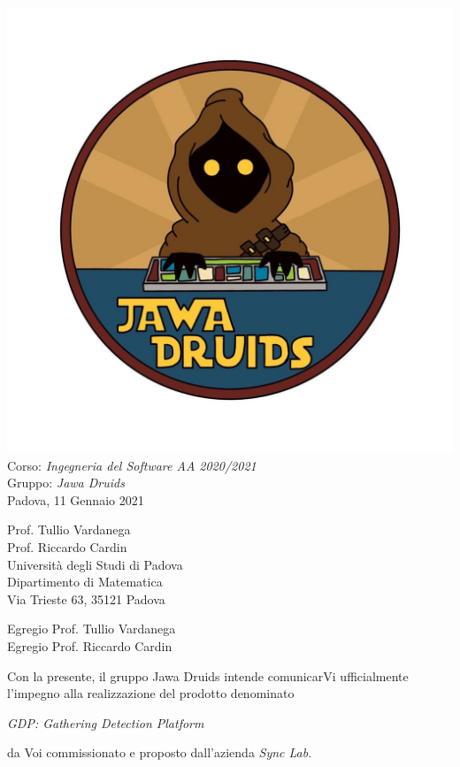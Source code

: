 \documentclass[a4paper,12pt]{report}
\begin{document}
\includegraphics[width=0.7\linewidth]{immagini/DRUIDSLOGO.jpg}\\[4ex]
Corso: \textit{Ingegneria del Software AA 2020/2021}\\ Gruppo: \textit{Jawa Druids} \\ Padova, 11 Gennaio 2021 \\
\begin{flushright}
  Prof. Tullio Vardanega \\
  Prof. Riccardo Cardin \\
  Università degli Studi di Padova \\
  Dipartimento di Matematica \\
  Via Trieste 63, 35121 Padova \\
\end{flushright}
Egregio Prof. Tullio Vardanega \\
Egregio Prof. Riccardo Cardin \\
\vspace{0.2cm}

Con la presente, il gruppo Jawa Druids intende comunicarVi ufficialmente l’impegno alla realizzazione del prodotto denominato
\begin{center}
  \textit{GDP: Gathering Detection Platform}
\end{center}
da Voi commissionato e proposto dall'azienda \textit{Sync Lab}.
\end{document}
